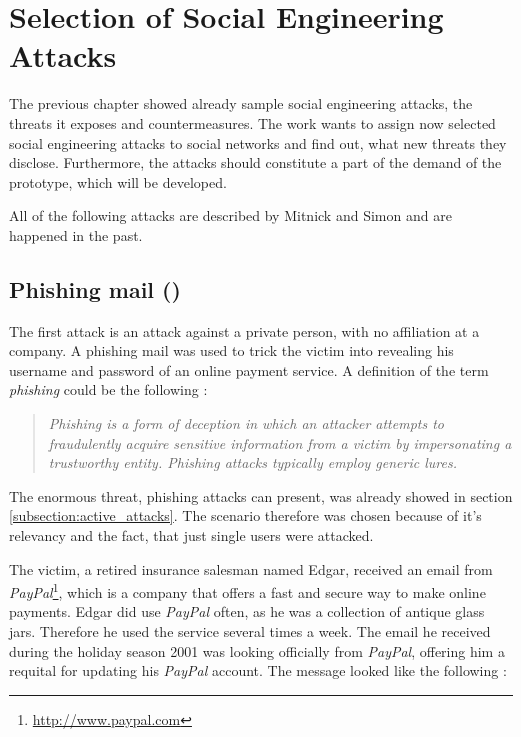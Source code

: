 \chapter{Selection of Social Engineering Attacks}
\label{chapter:attacks}

The previous chapter showed already sample social engineering attacks, the
threats it exposes and countermeasures. The work wants to assign now selected
social engineering attacks to social networks and find out, what new threats
they disclose. Furthermore, the attacks should constitute a part of the demand
of the prototype, which will be developed.

All of the following attacks are described by Mitnick and Simon
\cite{mitnick2003} and are happened in the past.

\section[Phishing mail]{Phishing mail (\cite[pp. 97-100]{mitnick2003})}
\label{sec:phishing_mail}

The first attack is an attack against a private person, with no affiliation at
a company. A phishing mail was used to trick the victim into revealing his
username and password of an online payment service.  A definition of the term
\textit{phishing} could be the following \cite{jagatic2007}:

\begin{quote}
\textit{Phishing is a form of deception in which an attacker attempts to
fraudulently acquire sensitive information from a victim by impersonating a
trustworthy entity. Phishing attacks typically employ generic
\glqq{}lures\grqq{}.}
\end{quote}

The enormous threat, phishing attacks can present, was already showed in 
section \ref{subsection:active_attacks}. The scenario therefore was chosen because of
it's relevancy and the fact, that just single users were attacked.

The victim, a retired insurance salesman named Edgar, received an email from
\textit{PayPal}\footnote{\url{http://www.paypal.com}}, which is a company that
offers a fast and secure way to make online payments. Edgar did use
\textit{PayPal} often, as he was a collection of antique glass jars. Therefore
he used the service several times a week. The email he received during the
holiday season 2001 was looking officially from \textit{PayPal}, offering him a
requital for updating his \textit{PayPal} account. The message looked like the
following \cite[p. 97]{mitnick2003}:

